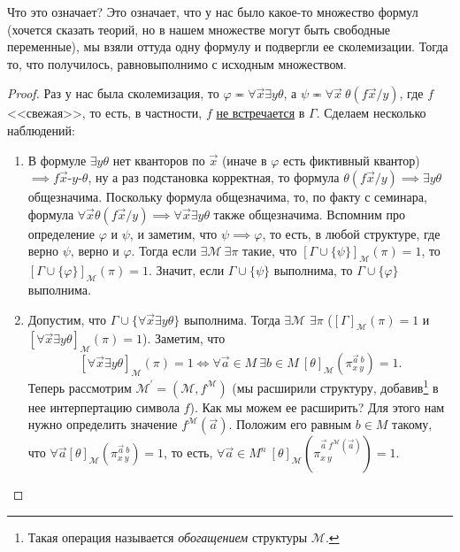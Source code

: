 \documentclass[a4paper, fleqn]{article}
\begin{document}
    Что это означает?
    Это означает, что у нас было какое-то множество формул (хочется сказать теорий, но в нашем множестве могут быть свободные переменные), мы взяли оттуда одну формулу и подвергли ее сколемизации.
    Тогда то, что получилось, равновыполнимо с исходным множеством.
    
    \begin{proof}
        Раз у нас была сколемизация, то $\varphi \eqcirc \forall \vec{x} \exists y \theta$, а $\psi \eqcirc \forall \vec{x}~ \theta(f\vec{x}/y)$, где $f$ <<свежая>>, то есть, в частности, $f$ \underline{не встречается} в $\Gamma$.
        Сделаем несколько наблюдений:
        \begin{enumerate}
            \item В формуле $\exists y \theta$ нет кванторов по $\vec{x}$ (иначе в $\varphi$ есть фиктивный квантор) $\implies f\vec{x}$-$y$-$\theta$, ну а раз подстановка корректная, то формула $\theta(f\vec{x}/y) \implies \exists y \theta$ общезначима.
            Поскольку формула общезначима, то, по факту с семинара, формула $\forall \vec{x} \theta(f\vec{x}/y) \implies \forall \vec{x} \exists y \theta$ также общезначима.
            Вспомним про определение $\varphi$ и $\psi$, и заметим, что $\psi \implies \varphi$, то есть, в любой структуре, где верно $\psi$, верно и $\varphi$.
            Тогда если $\exists \mathcal{M}~ \exists \pi$ такие, что $[\Gamma \cup \{\psi\}]_{\mathcal{M}}(\pi) = 1$, то $[\Gamma \cup \{\varphi\}]_{\mathcal{M}}(\pi) = 1$.
            Значит, если $\Gamma \cup \{\psi\}$ выполнима, то $\Gamma \cup \{\varphi\}$ выполнима.
            \item Допустим, что $\Gamma \cup \{ \forall \vec{x} \exists y \theta \}$ выполнима.
            Тогда $\exists \mathcal{M}$ $\exists \pi$ ($[\Gamma]_{\mathcal{M}}(\pi) = 1$ и $[\forall \vec{x} \exists y \theta]_{\mathcal{M}}(\pi) = 1$).
            Заметим, что
            $$
            [\forall \vec{x} \exists y \theta]_{\mathcal{M}}(\pi) = 1 \iff \forall \vec{a} \in M~ \exists b \in M~ [\theta]_{\mathcal{M}}(\pi_{x~y}^{\vec{a}~b}) = 1.
            $$
            Теперь рассмотрим $\mathcal{M}^{\prime} = (\mathcal{M}, f^{\mathcal{M}})$ (мы расширили структуру, добавив\footnote{Такая операция называется {\it обогащением} структуры $\mathcal{M}$.} в нее интерпертацию символа $f$).
            Как мы можем ее расширить?
            Для этого нам нужно определить значение $f^{\mathcal{M}}(\vec{a})$.
            Положим его равным $b \in M$ такому, что $\forall \vec{a} [\theta]_{\mathcal{M}}(\pi_{x~y}^{\vec{a}~b}) = 1$, то есть, $\forall \vec{a} \in M^{n}~ [\theta]_{\mathcal{M}}(\pi_{x~y}^{\vec{a}~f^{\mathcal{M}}(\vec{a})}) = 1$.

\end{enumerate}
\end{proof}
\end{document}

